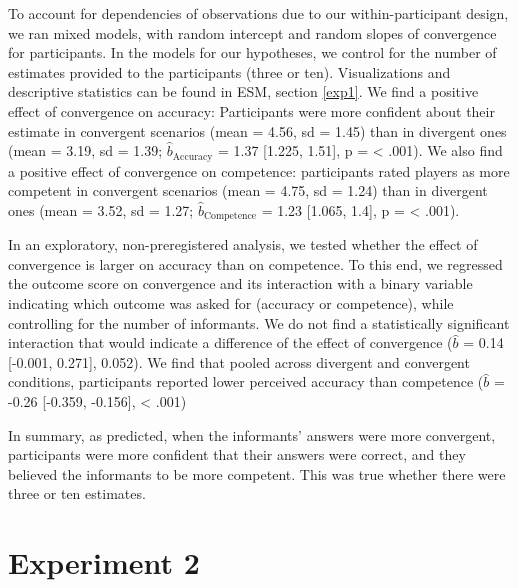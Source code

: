 \documentclass[
  doc,floatsintext]{apa6}
\begin{document}
To account for dependencies of observations due to our within-participant design, we ran mixed models, with random intercept and random slopes of convergence for participants. In the models for our hypotheses, we control for the number of estimates provided to the participants (three or ten). Visualizations and descriptive statistics can be found in ESM, section \ref{exp1}. We find a positive effect of convergence on accuracy: Participants were more confident about their estimate in convergent scenarios (mean = 4.56, sd = 1.45) than in divergent ones (mean = 3.19, sd = 1.39; \(\hat{b}_{\text{Accuracy}}\) = 1.37 {[}1.225, 1.51{]}, p = \textless{} .001). We also find a positive effect of convergence on competence: participants rated players as more competent in convergent scenarios (mean = 4.75, sd = 1.24) than in divergent ones (mean = 3.52, sd = 1.27; \(\hat{b}_{\text{Competence}}\) = 1.23 {[}1.065, 1.4{]}, p = \textless{} .001).

In an exploratory, non-preregistered analysis, we tested whether the effect of convergence is larger on accuracy than on competence. To this end, we regressed the outcome score on convergence and its interaction with a binary variable indicating which outcome was asked for (accuracy or competence), while controlling for the number of informants. We do not find a statistically significant interaction that would indicate a difference of the effect of convergence (\(\hat{b}\) = 0.14 {[}-0.001, 0.271{]}, 0.052). We find that pooled across divergent and convergent conditions, participants reported lower perceived accuracy than competence (\(\hat{b}\) = -0.26 {[}-0.359, -0.156{]}, \textless{} .001)

In summary, as predicted, when the informants' answers were more convergent, participants were more confident that their answers were correct, and they believed the informants to be more competent. This was true whether there were three or ten estimates.

\section{Experiment 2}\label{experiment-2}
\end{document}
